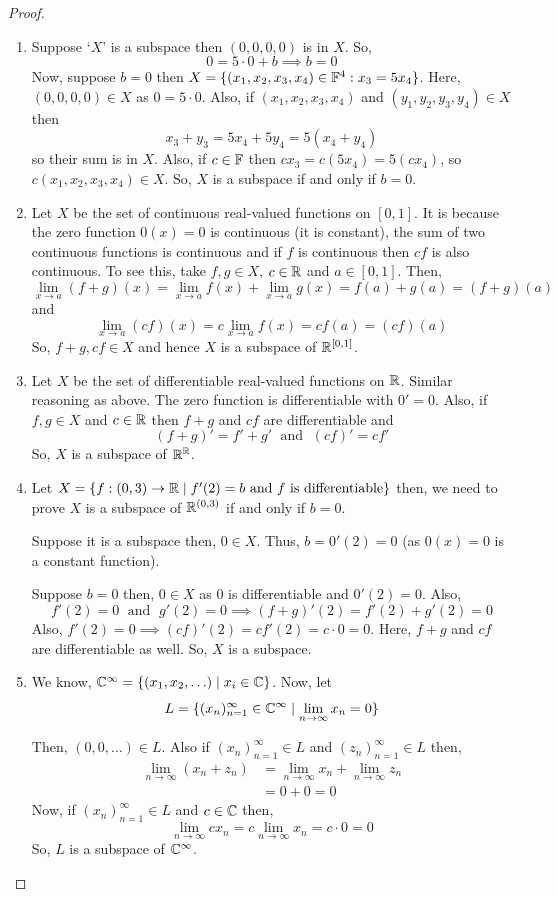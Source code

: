 \begin{proof} \leavevmode
\begin{enumerate}
\item[(a)] Suppose `$X$' is a subspace then $(0,0,0,0)$ is in $X$. So,
\[
0 = 5 \cdot 0 + b \implies b = 0
\]
Now, suppose $b = 0$ then $X = \{(x_1, x_2, x_3, x_4) \in \mathbb{F}^4 : x_3 = 5x_4\}$. Here, $(0,0,0,0) \in X$ as $0 = 5 \cdot 0$. Also, if $(x_1, x_2, x_3, x_4)$ and $(y_1, y_2, y_3, y_4) \in X$ then
\[
x_3 + y_3 = 5x_4 + 5y_4 = 5(x_4 + y_4)
\]
so their sum is in $X$. Also, if $c \in \mathbb{F}$ then $cx_3 = c(5x_4) = 5(cx_4)$, so $c(x_1, x_2, x_3, x_4) \in X$. So, $X$ is a subspace if and only if $b = 0$.
\item[(b)] Let $X$ be the set of continuous real-valued functions on $[0,1]$. It is because the zero function $0(x) = 0$ is continuous (it is constant), the sum of two continuous functions is continuous and if $f$ is continuous then $cf$ is also continuous. To see this, take $f, g \in X$, $c \in \mathbb{R}$ and $a \in [0,1]$. Then,
\[
\lim_{x \to a} (f+g)(x) = \lim_{x \to a} f(x) + \lim_{x \to a} g(x) = f(a) + g(a) = (f+g)(a)
\]
and
\[
\lim_{x \to a} (cf)(x) = c \lim_{x \to a} f(x) = cf(a) = (cf)(a)
\]
So, $f+g, cf \in X$ and hence $X$ is a subspace of $\mathbb{R}^{[0,1]}$.
\item[(c)] Let $X$ be the set of differentiable real-valued functions on $\mathbb{R}$. Similar reasoning as above. The zero function is differentiable with $0' = 0$. Also, if $f, g \in X$ and $c \in \mathbb{R}$ then $f+g$ and $cf$ are differentiable and
\[
(f+g)' = f' + g' \;\text{ and }\; (cf)' = cf'
\]
So, $X$ is a subspace of $\mathbb{R}^{\mathbb{R}}$.
\item[(d)] Let $X = \{f : (0,3) \to \mathbb{R} \mid f'(2) = b \text{ and } f \text{ is differentiable}\}$ then, we need to prove $X$ is a subspace of
$\mathbb{R}^{(0,3)}$ if and only if $b = 0$.

Suppose it is a subspace then, $0 \in X$. Thus, $b = 0'(2) = 0$ (as $0(x) = 0$ is a constant function).

Suppose $b = 0$ then, $0 \in X$ as $0$ is differentiable and $0'(2) = 0$. Also,
\[
f'(2) = 0 \; \text{ and }\; g'(2) = 0 \implies (f+g)'(2) = f'(2) + g'(2) = 0
\]
Also, $f'(2) = 0 \implies (cf)'(2) = cf'(2) = c \cdot 0 = 0$. Here, $f+g$ and $cf$ are differentiable as well. So, $X$ is a subspace.
\item[(e)] We know, $\mathbb{C}^{\infty} = \{(x_1, x_2, \ldots) \mid x_i \in \mathbb{C}\}$. Now, let
\[ L = \{(x_n)_{n=1}^{\infty} \in \mathbb{C}^{\infty} \mid \lim_{n \to \infty} x_n = 0\} \]

Then, $(0,0,\ldots) \in L$. Also if $(x_n)_{n=1}^{\infty} \in L$ and $(z_n)_{n=1}^{\infty} \in L$ then,
\begin{align*}
\lim_{n \to \infty} (x_n + z_n) &= \lim_{n \to \infty} x_n + \lim_{n \to \infty} z_n \\
&= 0 + 0 = 0
\end{align*}
Now, if $(x_n)_{n=1}^{\infty} \in L$ and $c \in \mathbb{C}$ then,
\[
\lim_{n \to \infty} c x_n = c \lim_{n \to \infty} x_n = c \cdot 0 = 0
\]
So, $L$ is a subspace of $\mathbb{C}^{\infty}$.
\end{enumerate}
\end{proof}

